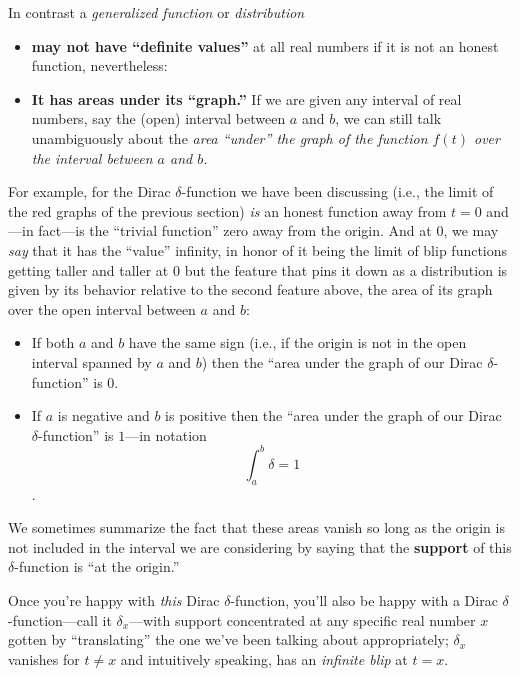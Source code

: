 \documentclass[11pt]{article}
\theoremstyle{plain}
\theoremstyle{definition}
\numberwithin{equation}{section}
\numberwithin{figure}{section}
\numberwithin{table}{section}
\begin{document}
In contrast a {\it generalized function}  or  {\it distribution} 

\begin{itemize}
\item {\bf may not have ``definite values''} at all real numbers if it is not an honest function, nevertheless:
     
\item  {\bf It has areas under its ``graph.''} If we are given any interval of real numbers, say the (open) interval between $a$ and $b$, we can still talk unambiguously about the {\it area ``under'' the graph of the function $f(t)$ over the interval  between $a$ and $b$.}
\end{itemize} 

For example, for the Dirac $\delta$-function we have been discussing (i.e., the limit of the red graphs of the previous section) {\it is} an honest function away from $t=0$ and ---in fact---is the ``trivial function'' zero away from the origin.  And at $0$, we may {\it say} that it has the ``value'' infinity, in honor of it being the limit of blip functions getting taller and taller at $0$ but the feature that pins it down as a distribution is given by its behavior relative to the second feature above, the area of its graph over  the open interval  between $a$ and $b$: 

\begin{itemize}
\item 
If both $a$ and $b$  have the same sign  (i.e., if the origin is not in the open interval spanned by $a$ and $b$) then the ``area under the graph of our Dirac $\delta$-function'' is $0$.
\item If $a$ is negative and $b$ is positive then the ``area under the graph of our Dirac $\delta$-function'' is $1$---in notation $$\int_a^b\delta = 1$$.
\end{itemize}


 We sometimes summarize the fact that these areas vanish so long as the origin is not included in the interval we are considering by saying that the {\bf support} of this $\delta$-function is ``at the origin.''  
 
 
 Once you're happy with  {\it this} Dirac $\delta$-function, you'll also be happy with a Dirac $\delta$-function---call it $\delta_x$---with support concentrated at any specific real number $x$ gotten by ``translating'' the one we've been talking about appropriately; $\delta_x$ vanishes for $t \ne x$ and intuitively  speaking, has an {\it infinite blip} at $t=x$.
     
\end{document}
